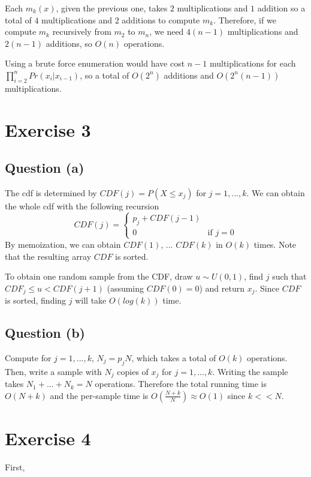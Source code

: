 \documentclass{article}
\begin{document}
Each $m_{k}(x)$, given the previous one, takes $2$ multiplications and $1$ addition so a total of $4$ multiplications and $2$ additions to compute $m_{k}$. Therefore, if we compute $m_{k}$ recursively from $m_{2}$ to $m_{n}$, we need  $4(n-1)$ multiplications and $2(n-1)$ additions, so $O(n)$ operations.

\bigskip
Using a brute force enumeration would have cost $n-1$ multiplications for each $\prod_{i=2}^{n}Pr(x_{i}|x_{i-1}) $, so a total of $O(2^{n})$ additions and $O(2^{n}(n-1))$ multiplications. 

\section{Exercise 3}
\subsection{Question (a)}
The cdf is determined by $CDF(j)=P(X\leq x_{j})$ for $j=1,..., k$. We can obtain the whole cdf with the following recursion
\begin{equation}
CDF(j) =\begin{cases}
 p_{j} + CDF(j-1) \\
 0 & \mbox{if } j=0
\end{cases}
\end{equation}
By memoization, we can obtain $CDF(1)$, ... $CDF(k)$ in $O(k)$ times. Note that the resulting array $CDF$ is sorted. 


To obtain one random sample from the CDF, draw $u\sim U(0,1)$, find $j$ such that $CDF_{j} \leq u < CDF(j+1)$ (assuming $CDF(0)=0$) and return $x_{j}$. Since $CDF$ is sorted, finding $j$ will take $O(log(k))$ time.

\subsection{Question (b)}
Compute for $j=1,..., k$, $N_{j}=p_{j}N$, which takes a total of $O(k)$ operations. Then, write a sample with $N_{j}$ copies of $x_{j}$ for $j=1,..., k$. Writing the sample takes $N_{1} + ... + N_{k}=N$ operations. Therefore the total running time is $O(N+k)$ and the per-sample time is $O\left(\frac{N+k}{N}\right)\approx O(1)$ since $k<<N$. 

\section{Exercise 4}


First, 
\end{document}
